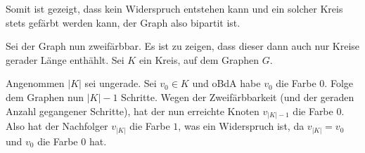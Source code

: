 \documentclass[a4paper]{article}
\begin{document}
Somit ist gezeigt, dass kein Widerspruch entstehen kann und ein solcher Kreis
stets gefärbt werden kann, der Graph also bipartit ist.

Sei der Graph nun zweifärbbar. Es ist zu zeigen, dass dieser dann auch nur Kreise gerader Länge enthählt. Sei $K$ ein Kreis, auf dem Graphen $G$.

Angenommen $|K|$ sei ungerade. Sei $v_0 \in K$ und oBdA habe $v_0$ die Farbe $0$. Folge dem Graphen nun $|K| - 1$ Schritte. Wegen der Zweifärbbarkeit (und der geraden Anzahl gegangener Schritte), hat der nun erreichte Knoten $v_{|K|-1}$ die Farbe $0$. Also hat der Nachfolger $v_{|K|}$ die Farbe $1$, was ein Widerspruch ist, da $v_{|K|} = v_0$ und $v_0$ die Farbe $0$ hat.
\end{document}
